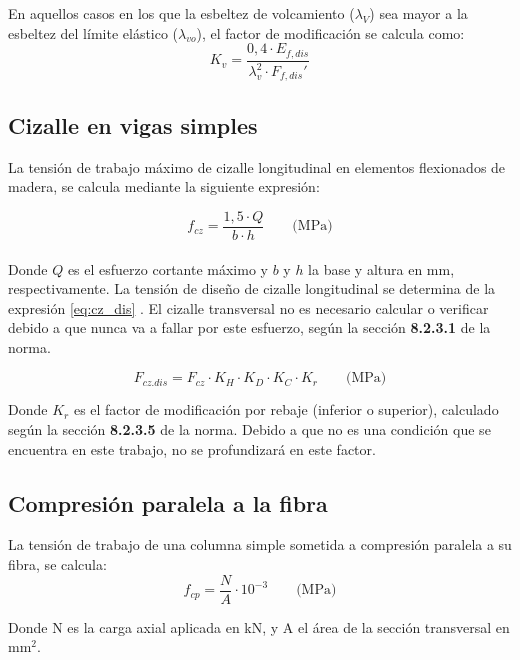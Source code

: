 En aquellos casos en los que la esbeltez de volcamiento ($\lambda_V$) sea mayor a la esbeltez del límite elástico ($\lambda_{vo}$), el factor de modificación se calcula como:
\begin{equation}\label{eq:k_v}
	K_v = \frac{0,4\cdot E_{f,dis}}{\lambda_{v}^2 \cdot F_{f,dis}'}
\end{equation}

\subsection{Cizalle en vigas simples}
La tensión de trabajo máximo de cizalle longitudinal en elementos flexionados de madera, se calcula mediante la siguiente expresión:

\begin{equation} \label{eq:f_cz}
f_{cz} = \frac{1,5 \cdot Q}{b \cdot h} \qquad \text{(MPa)}
\end{equation}
\\
Donde $Q$ es el esfuerzo cortante máximo y $b$ y $h$ la base y altura en mm, respectivamente. La tensión de diseño de cizalle longitudinal se determina de la expresión \ref{eq:cz_dis} . El cizalle transversal no es necesario calcular o verificar debido a que nunca va a fallar por este esfuerzo, según la sección \textbf{8.2.3.1} de la norma.

\begin{equation}\label{eq:cz_dis}
	F_{cz.dis} = F_{cz} \cdot K_H \cdot K_D \cdot K_C \cdot K_r \qquad \text{(MPa)}
\end{equation}

Donde $K_r$ es el factor de modificación por rebaje (inferior o superior), calculado según la sección \textbf{8.2.3.5} de la norma. Debido a que no es una condición que se encuentra en este trabajo, no se profundizará en este factor.\\


\subsection{Compresión paralela a la fibra}
\label{sec:cp}
La tensión de trabajo de una columna simple sometida a compresión paralela a su fibra, se calcula:
\begin{equation}\label{eq:f_cp}
	f_{cp}= \frac{N}{A} \cdot 10^{-3} \qquad \text{(MPa)}
\end{equation}

Donde N es la carga axial aplicada en kN, y A el área de la sección transversal en mm$^2$. 

